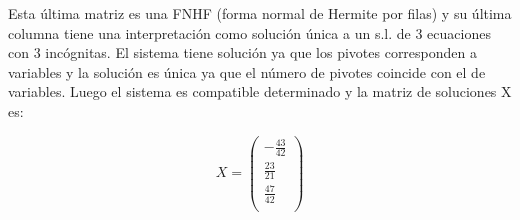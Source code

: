 \documentclass[11pt, a4paper]{article}
\newif\IfInSansMode
\theoremstyle{theorem-style}
\theoremstyle{definition-style}
\theoremstyle{remark-style}
\theoremstyle{example-style}
\begin{document}
Esta última matriz es una FNHF (forma normal de Hermite por filas) y su última columna tiene una interpretación como solución única a un s.l. de 3 ecuaciones con 3 incógnitas. El sistema tiene solución ya que los pivotes corresponden a variables y la solución es única ya que el número de pivotes coincide con el de variables. Luego el sistema es compatible determinado y la matriz de soluciones X es: 

$$X = \begin{pmatrix}
-\frac{43}{42} \\
\frac{23}{21} \\
\frac{47}{42} \\
\end{pmatrix}$$






\end{document}
